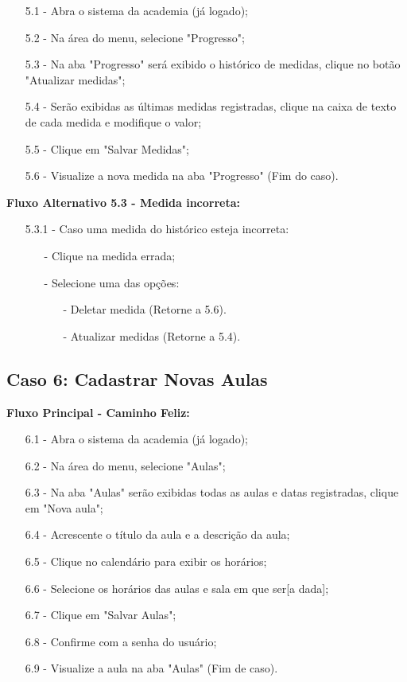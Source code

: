 \documentclass{article}
\begin{document}
    \begin{itemize}
        \item[5.1 -] Abra o sistema da academia (já logado);
        \item[5.2 -] Na área do menu, selecione "Progresso";
        \item[5.3 -] Na aba "Progresso" será exibido o histórico de medidas, clique no botão "Atualizar medidas";
        \item[5.4 -] Serão exibidas as últimas medidas registradas, clique na caixa de texto de cada medida e modifique o valor;
        \item[5.5 -] Clique em "Salvar Medidas";
        \item[5.6 -] Visualize a nova medida na aba "Progresso" (Fim do caso).
    \end{itemize}
    
    \textbf{Fluxo Alternativo 5.3 - Medida incorreta:}

    \begin{itemize}
        \item[5.3.1 -] Caso uma medida do histórico esteja incorreta:
        \begin{itemize}
            \item[-] Clique na medida errada;
            \item[-] Selecione uma das opções:
            \begin{itemize}
                \item[-] Deletar medida (Retorne a 5.6).
                \item[-] Atualizar medidas (Retorne a 5.4).
            \end{itemize}
        \end{itemize}
    \end{itemize}
    
\subsection{Caso 6: Cadastrar Novas Aulas}

    \textbf{Fluxo Principal - Caminho Feliz:}

    \begin{itemize}
        \item[6.1 -] Abra o sistema da academia (já logado);
        \item[6.2 -] Na área do menu, selecione "Aulas";
        \item[6.3 -] Na aba "Aulas" serão exibidas todas as aulas e datas registradas, clique em "Nova aula";
        \item[6.4 -] Acrescente o título da aula e a descrição da aula;
        \item[6.5 -] Clique no calendário para exibir os horários;
        \item[6.6 -] Selecione os horários das aulas e sala em que ser[a dada];
        \item[6.7 -] Clique em "Salvar Aulas";
        \item[6.8 -] Confirme com a senha do usuário;
        \item[6.9 -] Visualize a aula na aba "Aulas" (Fim de caso).
    \end{itemize}
    
\end{document}

